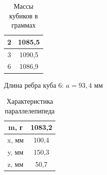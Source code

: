 \begin{table}[!h]
   \centering
   \caption{Массы кубиков в граммах}
   \begin{tabular}{|c|c|}
   \hline
       2 & 1085,5  \\ \hline
       3 & 1090,5  \\ \hline
       6 & 1086,9  \\ \hline
   \end{tabular}
\end{table}
Длина ребра куба 6: $ a = 93,4 \text{ мм } $
\begin{table}[!ht]
   \centering
   \caption{Характеристика параллелепипеда}
   \begin{tabular}{|c|c|}
   \hline
       m, г & 1083,2 \\ \hline
       x, мм & 100,4 \\ \hline
       y, мм & 150,3 \\ \hline
       z, мм & 50,7 \\ \hline
   \end{tabular}
\end{table}

